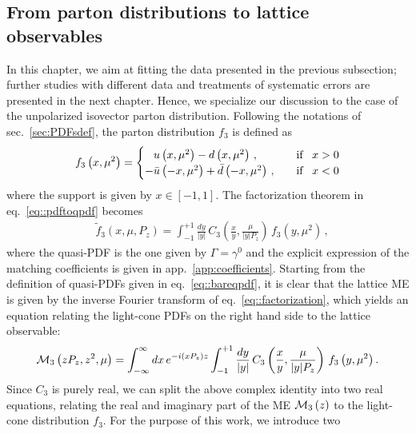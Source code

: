 \subsection{From parton distributions to lattice observables}
\label{subsec:thpredictions}
In this chapter, we aim at fitting the data presented in the previous subsection;
further studies with different data and treatments of systematic
errors are presented in the next chapter. Hence, we specialize our discussion
to the case of the unpolarized isovector parton distribution. Following the
notations of sec.~\ref{sec:PDFsdef}, the parton distribution $f_{3}$ is
defined as
\begin{align}
	f_{3}\lp x, \mu^2 \rp = 
	\begin{cases}
      \phantom{-} u\lp x, \mu^2 \rp - d\lp x, \mu^2\rp\, , \quad                 %
      &\text{if} \,\,\,\,\, x > 0 \\
      -\bar{u}\lp -x, \mu^2 \rp + \bar{d}\lp -x, \mu^2 \rp\, , \quad %
      &\text{if} \,\,\,\,\, x < 0 
	\end{cases}
\end{align} 
where the support is given by $x\in \left[ -1, 1 \right]$. The factorization
theorem in eq.~\eqref{eq::pdftoqpdf} becomes
\begin{align}
	\label{eq::factorization}
	  & \tilde{f}_{3}\left(x,\mu,P_z\right) = \int_{-1}^{+1} \frac{dy}{|y|}\,C_3\left(\frac{x}{y},\frac{\mu}{|y|P_z}\right)\, 
	  f_{3}\left(y,\mu^2\right)\, ,
\end{align}
where the quasi-PDF is the one given by $\Gamma = \gamma^0$ and the explicit
expression of the matching coefficients is given in
app.~\ref{app:coefficients}. Starting from the definition of quasi-PDFs
given in eq.~\eqref{eq::bareqpdf}, it is clear that the lattice ME is given by the
inverse Fourier transform of eq.~\eqref{eq::factorization}, which yields an
equation relating the light-cone PDFs on the right hand side to the lattice observable:
\begin{align}
	\label{eq:factorisedME}
	\mathcal{M}_{3}\left( z P_z, z^2,\mu\right) = 
	\int_{-\infty}^{\infty} dx \, e^{-i \left( x P_z \right) z} 
	\int_{-1}^{+1} \frac{dy}{|y|}\,
	C_3\left(\frac{x}{y},\frac{\mu}{|y|P_z}\right)\, 
	f_{3}\left(y,\mu^2\right). 
\end{align}
Since $C_3$ is purely real, we can split the above complex identity into two real equations, relating the
real and imaginary part of the ME $\mathcal{M}_{3}\left( z \right)$ to the
light-cone distribution $f_{3}$. For the purpose of this work, we introduce two

